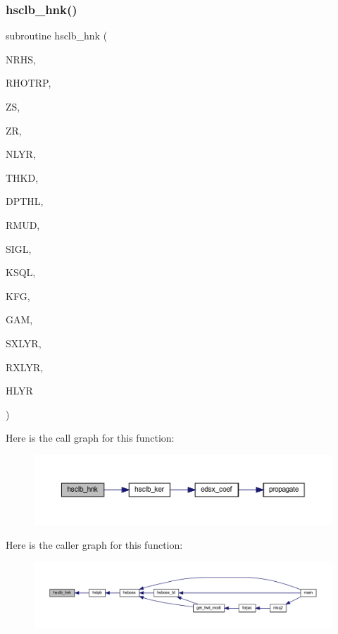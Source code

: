 \subsubsection{\texorpdfstring{hsclb\+\_\+hnk()}{hsclb\_hnk()}}
{\footnotesize\ttfamily subroutine hsclb\+\_\+hnk (\begin{DoxyParamCaption}\item[{integer}]{N\+R\+HS,  }\item[{real, dimension(nrhs)}]{R\+H\+O\+T\+RP,  }\item[{real(kind=ql)}]{ZS,  }\item[{real(kind=ql)}]{ZR,  }\item[{integer}]{N\+L\+YR,  }\item[{real(kind=ql), dimension (nlyr)}]{T\+H\+KD,  }\item[{real(kind=ql), dimension (nlyr)}]{D\+P\+T\+HL,  }\item[{real(kind=ql), dimension(0\+:nlyr)}]{R\+M\+UD,  }\item[{complex(kind=ql), dimension (nlyr)}]{S\+I\+GL,  }\item[{complex(kind=ql), dimension (nlyr)}]{K\+S\+QL,  }\item[{integer}]{K\+FG,  }\item[{integer}]{G\+AM,  }\item[{integer}]{S\+X\+L\+YR,  }\item[{integer}]{R\+X\+L\+YR,  }\item[{complex, dimension(nrhs,3)}]{H\+L\+YR }\end{DoxyParamCaption})}

Here is the call graph for this function\+:\nopagebreak
\begin{figure}[H]
\begin{center}
\leavevmode
\includegraphics[width=350pt]{Leroi_8f90_ae6841c5477812a4e7255f7ed2da9a7c8_cgraph}
\end{center}
\end{figure}
Here is the caller graph for this function\+:\nopagebreak
\begin{figure}[H]
\begin{center}
\leavevmode
\includegraphics[width=350pt]{Leroi_8f90_ae6841c5477812a4e7255f7ed2da9a7c8_icgraph}
\end{center}
\end{figure}
\mbox{\label{Leroi_8f90_ab053f1c7997499ed6fca932a2f8cbecb}} 
